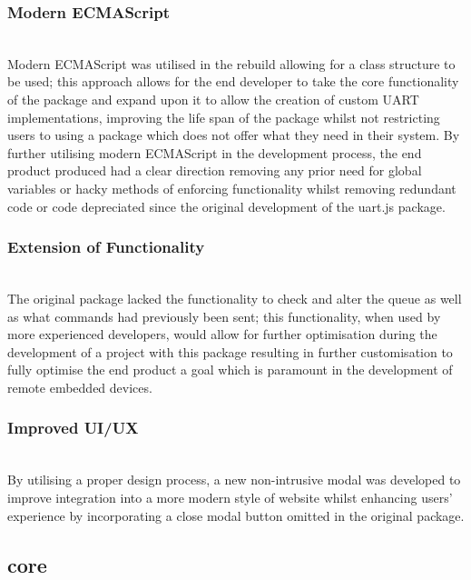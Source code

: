 \documentclass{l4proj}
\begin{document}
\subsubsection{Modern ECMAScript}\hfill\\
Modern ECMAScript was utilised in the rebuild allowing for a class structure to be used; this approach allows for the end developer to take the core functionality of the package and expand upon it to allow the creation of custom UART implementations, improving the life span of the package whilst not restricting users to using a package which does not offer what they need in their system. By further utilising modern ECMAScript in the development process, the end product produced had a clear direction removing any prior need for global variables or hacky methods of enforcing functionality whilst removing redundant code or code depreciated since the original development of the uart.js package.
\\
\subsubsection{Extension of Functionality}\hfill\\
The original package lacked the functionality to check and alter the queue as well as what commands had previously been sent; this functionality, when used by more experienced developers, would allow for further optimisation during the development of a project with this package resulting in further customisation to fully optimise the end product a goal which is paramount in the development of remote embedded devices.
\\ 
\subsubsection{Improved UI/UX}\hfill\\
By utilising a proper design process, a new non-intrusive modal was developed to improve integration into a more modern style of website whilst enhancing users' experience by incorporating a close modal button omitted in the original package.

\subsection{core}
\end{document}
